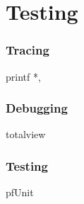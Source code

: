 \section{Testing}

\begin{frame}
    \frametitle{Tracing}
    printf *, 
\end{frame}
\begin{frame}
    \frametitle{Debugging}
    totalview
\end{frame}
\begin{frame}
    \frametitle{Testing}
    pfUnit 
\end{frame}
